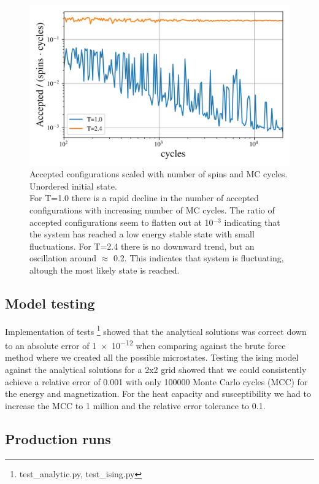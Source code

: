 \begin{figure}[H]
  \centering
  \includegraphics[width=\textwidth]{../figures/accepted.png}
  \caption{Accepted configurations scaled with number of spins and MC cycles.
  Unordered initial state. \\
  For T=1.0 there is a rapid decline in the number of accepted
  configurations with increasing number of MC cycles. The ratio of accepted
  configurations seem to flatten out at 10$^{-3}$ indicating that the system
  has reached a low energy stable state with small fluctuations.
  For T=2.4 there is no downward trend, but an oscillation around $\approx$ 0.2.
  This indicates that system is fluctuating, altough the most likely state is
  reached.}
  \label{fig:accepted}
\end{figure}

\subsection{Model testing}

Implementation of tests \footnote{test\_analytic.py, test\_ising.py} showed that the
analytical solutions was correct down to an absolute error of \num{1e-12}  when
comparing against the brute force method where we created all the possible
microstates.
Testing the ising model against the analytical solutions for a 2x2 grid showed
that we could consistently achieve a relative error of 0.001 with only 100000
Monte Carlo cycles (MCC) for the energy and magnetization. For the heat capacity
and susceptibility we had to increase the MCC to 1 million and the relative
error tolerance to 0.1.


\subsection{Production runs}

